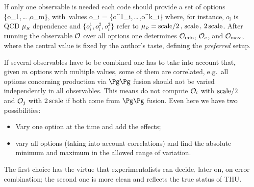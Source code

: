 If only one observable is needed each code should provide a set of options 
\bq
\{o_1,\,\dots\,,o_m\}, \qquad \hbox{with values}\quad
 o_i = \{o^1_i,\,\dots\,,o^k_i\}
\eq
where, for instance, $o_i$ is QCD $\mu_{{\scriptscriptstyle{R}}}$ dependence and 
$\{o^1_i,o^2_i,o^3_i\}$ refer to 
$\mu_{{\scriptscriptstyle{R}}} = \hbox{scale}/2\,,\,\hbox{scale}\,,\,2\,\hbox{scale}$.
After running the observable ${\cal O}$ over all options one determines 
${\cal O}_{\rm min}$, ${\cal O}_{\rm c}$, and ${\cal O}_{\rm max}$, where the 
central value is fixed by the author's taste, defining the {\em preferred} setup.

If several observables have to be combined one has to take into account that,
given $m$ options with multiple values, some of them are correlated, e.g.\ all 
options concerning production via $\Pg\Pg$ fusion should not be varied 
independently in all observables. This means do not compute ${\cal O}_i$ with 
$\hbox{scale}/2$ and ${\cal O}_j$ with $2\,\hbox{scale}$ if both come from 
$\Pg\Pg$ fusion. Even here we have two possibilities:
\begin{itemize}
\item Vary one option at the time and add the effects;
\item vary all options (taking into account correlations) and find the absolute 
minimum and maximum in the allowed range of variation.
\end{itemize}
The first choice has the virtue that experimentalists can decide, later on, on error
combination; the second one is more clean and reflects the true status of THU.

